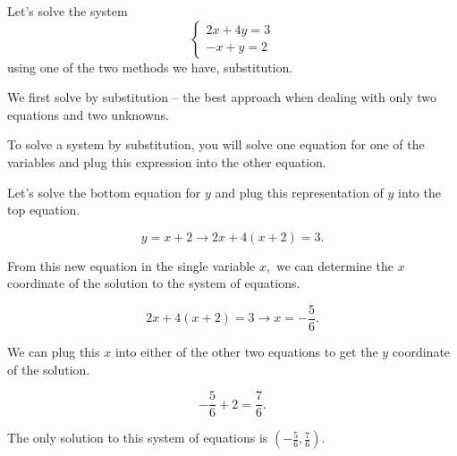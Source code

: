 \begin{example}
    Let's solve the system
    \[\begin{cases}
        2x+4y =3 \\
        -x+y =2
    \end{cases}\]
    using one of the two methods we have, substitution.

    We first solve by substitution -- the best approach when dealing with only two equations and two unknowns.

    To solve a system by substitution, you will solve one equation for one of the variables and plug this expression into the other equation.

    Let's solve the bottom equation for \(y\) and plug this representation of \(y\) into the top equation.

    \[y = x+2 \rightarrow 2x+4\left(x+2\right) = 3.\]

    From this new equation in the single variable \(x,\) we can determine the \(x\) coordinate of the solution to the system of equations.

    \[2x+4\left(x+2\right) = 3 \rightarrow x = -\frac{5}{6}.\]

    We can plug this \(x\) into either of the other two equations to get the \(y\) coordinate of the solution.

    \[-\frac{5}{6} + 2 = \frac{7}{6}.\]

    The only solution to this system of equations is \(\left(-\frac{5}{6},\frac{7}{6}\right).\)
\end{example}

